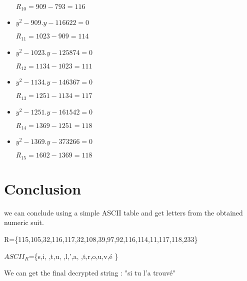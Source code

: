 \documentclass{article}
\begin{document}
\begin{itemize}
\begin{flushleft}
	$R_{10}=909-793=116$
\end{flushleft}
\item \begin{flushleft}
	$ y^{2}-909.y-116622=0$
	
	$R_{11}=1023-909=114$
\end{flushleft}
\item \begin{flushleft}
	$ y^{2}-1023.y-125874=0$
	
	$R_{12}=1134-1023=111$
\end{flushleft}
\item \begin{flushleft}
	$ y^{2}-1134.y-146367=0$
	
	$R_{13}=1251-1134=117$
\end{flushleft}
\item \begin{flushleft}
	$ y^{2}-1251.y-161542=0$
	
	$R_{14}=1369-1251=118$
\end{flushleft}
\item \begin{flushleft}
	$ y^{2}-1369.y-373266=0$
	
	$R_{15}=1602-1369=118$
\end{flushleft}
\end{itemize}

\section*{Conclusion}

\begin{flushleft}
	we can conclude using a simple ASCII table and get letters from the obtained numeric suit.

R=\{115,105,32,116,117,32,108,39,97,92,116,114,11,117,118,233\}

$ASCII_{R}$=\{s,i, ,t,u, ,l,',a, ,t,r,o,u,v,é \}
\end{flushleft}

\begin{center}
	We can get the final decrypted string : "si tu l'a trouvé"
\end{center}
\end{document}
